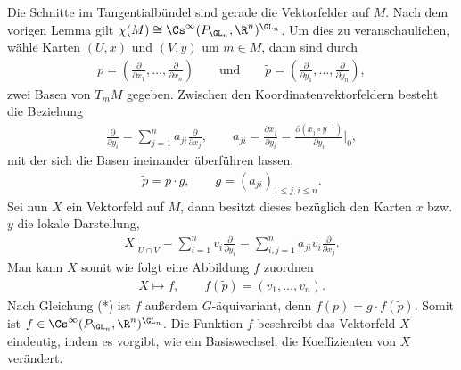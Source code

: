 \documentclass[%
	paper=a5,%
	fleqn,%
	DIV=18,%
	BCOR=0mm,
	fontsize=11pt,
	titlepage=false,%
	bibliography=totoc,
	DIV=18,%
	twoside=true,
	pdftitle=Riemannsche Geometrie,
	pdfauthor=Uwe Semmelmann,
	numbers=noendperiod]%
	{scrbook}
\begin{document}
\begin{ex}
Die Schnitte im Tangentialbündel sind gerade die Vektorfelder auf
$M$. Nach dem vorigen Lemma gilt $\chi(M)\cong
\Cs^\infty(P_{\GL_n},\R^n)^{\GL_n}$. Um dies zu veranschaulichen, wähle Karten
$(U,x)$ und $(V,y)$ um $m \in M$, dann sind durch
\begin{align*}
p = \left(\frac{\partial}{\partial x_1},\ldots,\frac{\partial}{\partial x_n}
\right)\qquad\text{und}\qquad
\tilde{p} = 
\left(\frac{\partial}{\partial y_1},\ldots,\frac{\partial}{\partial y_n}
\right),
\end{align*}
zwei Basen von $T_mM$ gegeben. Zwischen den Koordinatenvektorfeldern besteht
die Beziehung
\begin{align*}
\frac{\partial}{\partial y_i} = \sum_{j=1}^n a_{ji}\frac{\partial }{\partial
x_j},\qquad
a_{ji} = \frac{\partial x_j}{\partial y_i}
= \frac{\partial (x_j\circ y^{-1})}{\partial y_i}\bigg|_0,
\end{align*}
mit der sich die Basen ineinander überführen lassen,
\begin{align*}
\tilde{p} = p\cdot g,\qquad g = (a_{ji})_{1\le j,i\le n}.
\end{align*}
Sei nun $X$ ein Vektorfeld auf $M$, dann besitzt dieses bezüglich den Karten $x$
bzw. $y$ die lokale Darstellung,
\begin{align*}
X\big|_{U\cap V} = \sum_{i=1}^n v_i \frac{\partial}{\partial y_i}
= \sum_{i,j=1}^n a_{ji}v_i \frac{\partial}{\partial x_j}.\tag{*}
\end{align*}
Man kann $X$ somit wie folgt eine Abbildung $f$ zuordnen
\begin{align*}
X\mapsto f,\qquad f(\tilde{p}) = (v_1,\ldots,v_n).
\end{align*}
Nach Gleichung (*) ist $f$ außerdem $G$-äquivariant, denn $f(p) = g\cdot
f(\tilde{p})$. Somit ist
$f\in\Cs^\infty(P_{\GL_n}, \R^n)^{\GL_n}$. Die Funktion
$f$ beschreibt das Vektorfeld $X$ eindeutig, indem es vorgibt, wie ein
Basiswechsel, die Koeffizienten von $X$ verändert.\boxc
\end{ex}
\end{document}
